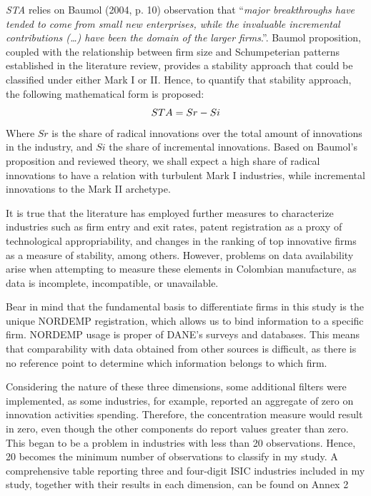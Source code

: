 \documentclass[12pt,a4paper]{article}
\begin{document}
\begin{enumerate}
	\textit{STA} relies on Baumol (2004, p. 10) observation that “\textit{major breakthroughs have tended to come from small new enterprises, while the invaluable incremental contributions (…) have been the domain of the larger firms}.”. Baumol proposition, coupled with the relationship between firm size and Schumpeterian patterns established in the literature review, provides a stability approach that could be classified under either Mark I or II. Hence, to quantify that stability approach, the following mathematical form is proposed: 
	\begin{equation}
		\centering
		STA = Sr - Si
	\end{equation}
Where $Sr$ is the share of radical innovations over the total amount of innovations in the industry, and $Si$ the share of incremental innovations. Based on Baumol’s proposition and reviewed theory, we shall expect a high share of radical innovations to have a relation with turbulent Mark I industries, while incremental innovations to the Mark II archetype. 
\end{enumerate}

It is true that the literature has employed further measures to characterize industries such as firm entry and exit rates, patent registration as a proxy of technological appropriability, and changes in the ranking of top innovative firms as a measure of stability, among others. However, problems on data availability arise when attempting to measure these elements in Colombian manufacture, as data is incomplete, incompatible, or unavailable.  

Bear in mind that the fundamental basis to differentiate firms in this study is the unique NORDEMP registration, which allows us to bind information to a specific firm. NORDEMP usage is proper of DANE’s surveys and databases. This means that comparability with data obtained from other sources is difficult, as there is no reference point to determine which information belongs to which firm. 

Considering the nature of these three dimensions, some additional filters were implemented, as some industries, for example, reported an aggregate of zero on innovation activities spending. Therefore, the concentration measure would result in zero, even though the other components do report values greater than zero. This began to be a problem in industries with less than 20 observations. Hence, 20 becomes the minimum number of observations to classify in my study. A comprehensive table reporting three and four-digit ISIC industries included in my study, together with their results in each dimension, can be found on Annex 2 
\end{document}
